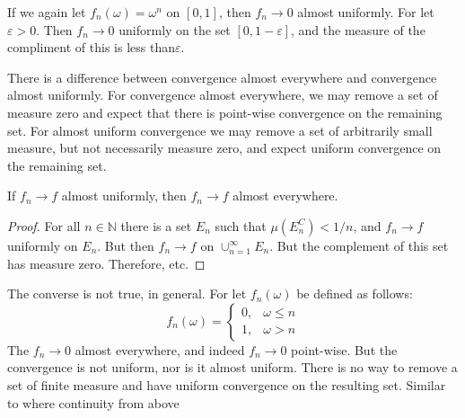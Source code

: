             \begin{example}
                If we again let $f_{n}(\omega)=\omega^{n}$ on
                $[0,1]$, then $f_{n}\rightarrow{0}$
                almost uniformly. For let $\varepsilon>0$. Then
                $f_{n}\rightarrow{0}$ uniformly on the set
                $[0,1-\varepsilon]$, and the measure of the
                compliment of this is less than$ \varepsilon$.
            \end{example}
            There is a difference between convergence almost
            everywhere and convergence almost uniformly. For
            convergence almost everywhere, we may remove a set
            of measure zero and expect that there is point-wise
            convergence on the remaining set. For almost uniform
            convergence we may remove a set of arbitrarily small
            measure, but not necessarily measure zero, and expect
            uniform convergence on the remaining set.
            \begin{theorem}
                If $f_{n}\rightarrow{f}$ almost uniformly,
                then $f_{n}\rightarrow{f}$ almost everywhere.
            \end{theorem}
            \begin{proof}
                For all $n\in\mathbb{N}$ there is a set
                $E_{n}$ such that $\mu(E_{n}^{C})<1/n$, and
                $f_{n}\rightarrow{f}$ uniformly on $E_{n}$.
                But then $f_{n}\rightarrow{f}$ on
                $\cup_{n=1}^{\infty}E_{n}$. But the complement
                of this set has measure zero. Therefore, etc.
            \end{proof}
            The converse is not true, in general. For let
            $f_{n}(\omega)$ be defined as follows:
            \begin{equation}
                f_{n}(\omega)=
                \begin{cases}
                    0,&\omega\leq{n}\\
                    1,&\omega>n
                \end{cases}
            \end{equation}
            The $f_{n}\rightarrow{0}$ almost everywhere, and
            indeed $f_{n}\rightarrow{0}$ point-wise. But
            the convergence is not uniform, nor is it
            almost uniform. There is no way to remove a set of
            finite measure and have uniform convergence on the
            resulting set. Similar to where continuity from above

